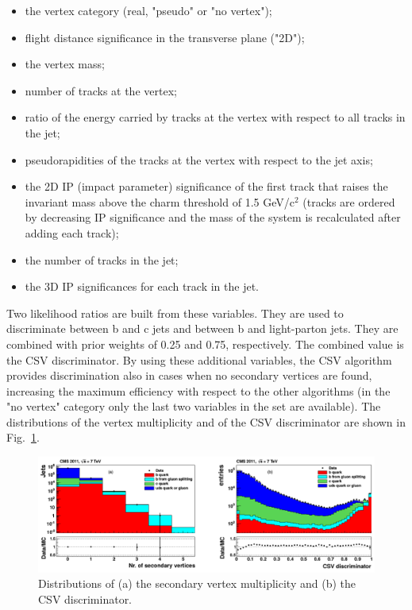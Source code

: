 \begin{itemize}
\item the vertex category (real, "pseudo" or "no vertex");
\item flight distance significance in the transverse plane ("2D");
\item the vertex mass;
\item number of tracks at the vertex;
\item ratio of the energy carried by tracks at the vertex with respect to all tracks in the jet;
\item pseudorapidities of the tracks at the vertex with respect to the jet axis;
\item the 2D IP (impact parameter) significance of the first track that raises the invariant mass above the charm threshold of 1.5 GeV/c$^{2}$ (tracks are ordered by decreasing IP significance and the mass of the system is recalculated after adding each track);
\item the number of tracks in the jet;
\item the 3D IP significances for each track in the jet.
\end{itemize}

Two likelihood ratios are built from these variables. They are used to discriminate between b and c jets and between b and light-parton jets.  They are combined with prior weights of 0.25 and 0.75, respectively. The combined value is the CSV discriminator. By using these additional variables, the CSV algorithm provides discrimination also in cases when no secondary vertices are found, increasing the maximum efficiency with respect to the other algorithms (in the "no vertex" category only the last two variables in the set are available). The distributions of the vertex multiplicity and of the CSV discriminator are shown in Fig.~\ref{fig:CSVfromPaper}.\\


\begin{figure}[h]
  \begin{center}
    \includegraphics[width=\textwidth]{figure/CH3/CSVpaper.png}
  \end{center}
  \caption{\label{fig:CSVfromPaper}\cite{btagAlgo} Distributions of (a) the secondary vertex multiplicity and (b) the CSV discriminator.}
\end{figure}
